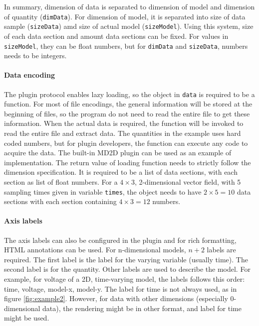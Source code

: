 In summary, dimension of data is separated to dimension of model and dimension of quantity (\lstinline{dimData}). For dimension of model, it is separated into size of data sample (\lstinline{sizeData}) amd size of actual model (\lstinline{sizeModel}). Using this system, size of each data section and amount data sections can be fixed. For values in \lstinline{sizeModel}, they can be float numbers, but for \lstinline{dimData} and \lstinline{sizeData}, numbers needs to be integers.

\paragraph{Data encoding}

The plugin protocol enables lazy loading, so the object in \lstinline{data} is required to be a function. For most of file encodings, the general information will be stored at the beginning of files, so the program do not need to read the entire file to get these information. When the actual data is required, the function will be invoked to read the entire file and extract data. The quantities in the example uses hard coded numbers, but for plugin developers, the function can execute any code to acquire the data. The built-in MD2D plugin  can be used as an example of implementation. The return value of loading function needs to strictly follow the dimension specification. It is required to be a list of data sections, with each section as list of float numbers. For a $4\times3$, 2-dimensional vector field, with 5 sampling times given in variable \lstinline{times}, the object needs to have $2\times5=10$ data sections with each section containing $4\times3=12$ numbers.

\paragraph{Axis labels}

The axis labels can also be configured in the plugin and for rich formatting, HTML annotations can be used. For n-dimensional models, $n+2$ labels are required. The first label is the label for the varying variable (usually time). The second label is for the quantity. Other labels are used to describe the model. For example, for voltage of a 2D, time-varying model, the labels follows this order: time, voltage, model-x, model-y. The label for time is not always used, as in figure \ref{fig:example2}. However, for data with other dimensions (especially 0-dimensional data), the rendering might be in other format, and label for time might be used.

